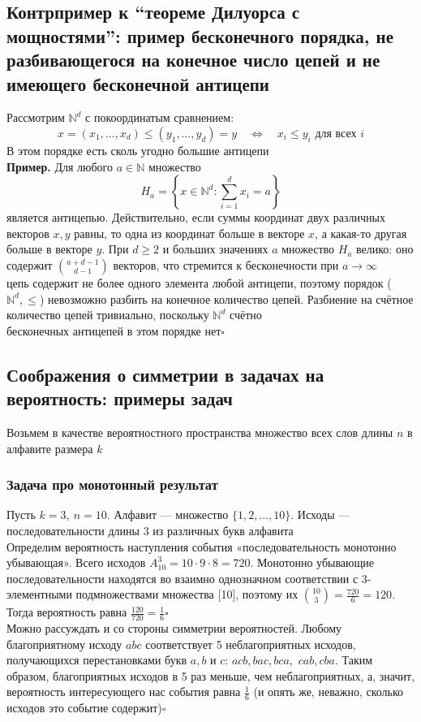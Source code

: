 \documentclass[a4paper]{article}
\newcommand{\qed}{\hfill$\square$}
\begin{document}
\subsection{Контрпример к “теореме Дилуорса с мощностями”: пример бесконечного порядка, не разбивающегося на конечное число цепей и не имеющего бесконечной антицепи}
Рассмотрим $\mathbb{N}^d$ с покоординатым сравнением:
$$x=\left(x_1, \ldots, x_d\right) \leqslant\left(y_1, \ldots, y_d\right)=y \quad \Leftrightarrow \quad x_i \leqslant y_i \text { для всех }i$$
В этом порядке есть сколь угодно большие антицепи\\[2mm]
\indent\textbf{Пример.} Для любого $a \in \mathbb{N}$ множество
$$H_a=\left\{x \in \mathbb{N}^d: \sum_{i=1}^d x_i=a\right\}$$
является антицепью. Действительно, если суммы координат двух различных векторов $x, y$ равны, то одна из координат больше в векторе $x$, а какая-то другая больше в векторе $y$. При $d \geqslant 2$ и больших значениях $a$ множество $H_a$ велико: оно содержит $\binom{a+d-1}{d-1}$ векторов, что стремится к бесконечности при $a \rightarrow \infty$\\[2mm]
 цепь содержит не более одного элемента любой антицепи, поэтому порядок ($\mathbb{N}^d, \leqslant$) невозможно разбить на конечное количество цепей. Разбиение на счётное количество цепей тривиально, поскольку $\mathbb{N}^d$ счётно\\[2mm]
 бесконечных антицепей в этом порядке нет\qed


\subsection{Соображения о симметрии в задачах на вероятность: примеры задач}
Возьмем в качестве вероятностного пространства множество всех слов длины $n$ в алфавите размера $k$
\subsubsection*{Задача про монотонный результат}
\indent Пусть $k=3,\ n=10$. Алфавит — множество $\{1, 2, \ldots, 10\}$. Исходы — последовательности длины 3 из различных букв алфавита\\[2mm]
\indent Определим вероятность наступления события «последовательность монотонно убывающая». Всего исходов $A^3_{10}=10\cdot9\cdot8=720$. Монотонно убывающие последовательности находятся во взаимно однозначном соответствии с 3-элементными подмножествами множества [10], поэтому их $\binom{10}{3}=\displaystyle\frac{720}{6}=120$. Тогда вероятность равна $\displaystyle\frac{120}{720}=\displaystyle\frac{1}{6}$\qed\\[2mm]
\indent Можно рассуждать и со стороны симметрии вероятностей. Любому благоприятному исходу $a b c$ соответствует 5 неблагоприятных исходов, получающихся перестановками букв $a, b$ и $c$: $acb, bac, bca,$ $cab, cba$. Таким образом, благоприятных исходов в 5 раз меньше, чем неблагоприятных, а, значит, вероятность интересующего нас события равна $\frac{1}{6}$ (и опять же, неважно, сколько исходов это событие содержит)\qed
\end{document}
